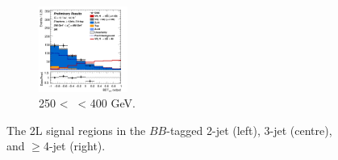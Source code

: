 \begin{figure}[h!]
\begin{subfigure}[b]{\textwidth}
        \includegraphics[width=0.32\textwidth]{Images/VH/Own_fit/postfit_VHbb/Region_distmva_BMax400_BMin250_DSR_J4_TTypebb_incJet1_T2_L2_Y6051_GlobalFit_conditionnal_mu1.png}
        \caption{250 < \ptv\ < 400 GeV.}
        \label{fig:plots_VHbb_2L_250_SR}
    \end{subfigure}
    \caption{The 2L signal regions in the $BB$-tagged 2-jet (left), 3-jet (centre), and $\geq$4-jet (right).}
     \label{fig:plots_VHbb_2L_SR}
\end{figure} 

\vspace*{\fill}\clearpage
\vspace*{\fill}

